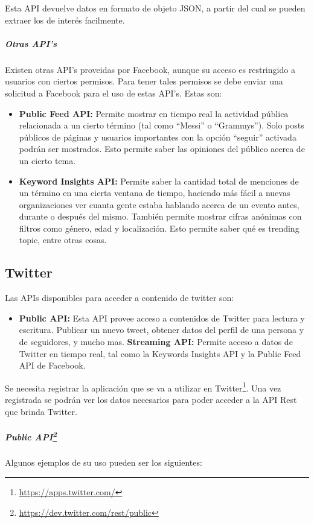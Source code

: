 \documentclass[oneside]{book}
\begin{document}
	Esta API devuelve datos en formato de objeto JSON, a partir del cual se pueden extraer los de inter\'{e}s facilmente.


	\subparagraph*{Otras API's}
	Existen otras API's proveidas por Facebook, aunque su acceso es restringido a usuarios con ciertos permisos. Para tener tales permisos se debe enviar una solicitud a Facebook para el uso de estas API's.
	Estas son:
	\begin{itemize}
		\item \textbf{Public Feed API:} Permite mostrar en tiempo real la actividad p\'{u}blica relacionada a un cierto t\'{e}rmino (tal como “Messi” o “Grammys”). Solo posts p\'{u}blicos de p\'{a}ginas y usuarios importantes con la opci\'{o}n “seguir” activada podr\'{a}n ser mostrados. Esto permite saber las opiniones del p\'{u}blico acerca de un cierto tema.
		\item \textbf{Keyword Insights API:} Permite saber la cantidad total de menciones de un t\'{e}rmino en una cierta ventana de tiempo, haciendo m\'{a}s f\'{a}cil a nuevas organizaciones ver cuanta gente estaba hablando acerca de un evento antes, durante o despu\'{e}s del mismo. Tambi\'{e}n permite mostrar cifras an\'{o}nimas con filtros como g\'{e}nero, edad y localizaci\'{o}n. Esto permite saber qu\'{e} es trending topic, entre otras cosas.
	\end{itemize}
	
\bigskip

\subsection{Twitter}
Las APIs disponibles para acceder a contenido de twitter son:
\begin{itemize}
	\item \textbf{Public API:} Esta API provee acceso a contenidos de Twitter para lectura y escritura. Publicar un nuevo tweet, obtener datos del perfil de una persona y de seguidores, y mucho mas.
	\textbf{Streaming API:} Permite acceso a datos de Twitter en tiempo real, tal como la Keywords Insights API y la Public Feed API de Facebook.
\end{itemize}


Se necesita registrar la aplicaci\'{o}n que se va a utilizar en Twitter\footnote{\url{https://apps.twitter.com/}}. Una vez registrada se podr\'{a}n ver los datos necesarios para poder acceder a la API Rest que brinda Twitter.

	\subparagraph*{Public API\footnote{\url{https://dev.twitter.com/rest/public}}}
	Algunos ejemplos de su uso pueden ser los siguientes:
\end{document}
